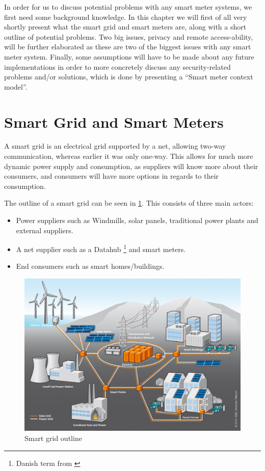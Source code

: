 In order for us to discuss potential problems with any smart meter systems, we first need some background knowledge.
In this chapter we will first of all very shortly present what the smart grid and smart meters are, along with a short outline of potential problems.
Two big issues, privacy and remote access-ability, will be further elaborated as these are two of the biggest issues with any smart meter system.
Finally, some assumptions will have to be made about any future implementations in order to more concretely discuss any security-related problems and/or solutions, which is done by presenting a ``Smart meter context model''.

\section{Smart Grid and Smart Meters}\label{smart_grid_smart_meter}
A smart grid is an electrical grid supported by a net, allowing two-way communication, whereas earlier it was only one-way.
This allows for much more dynamic power supply and consumption, as suppliers will know more about their consumers, and consumers will have more options in regards to their consumption.

The outline of a smart grid can be seen in \cref{fig:background:smartgrid}.
This consists of three main actors:

\begin{itemize}
	\item Power suppliers such as Windmills, solar panels, traditional power plants and external suppliers.
	\item A net supplier such as a Datahub \footnote{Danish term from \cite{LOV_nr_575_af_18-06-2012}} and smart meters.
	\item End consumers such as smart homes/buildings.
\end{itemize}

\begin{figure}[H]
	\includegraphics[width=\textwidth]{figures/SmartGrid_Ueberblick_ohneLegende.jpg}
	\caption{Smart grid outline\protect\footnotemark}
	\label{fig:background:smartgrid}
\end{figure}

